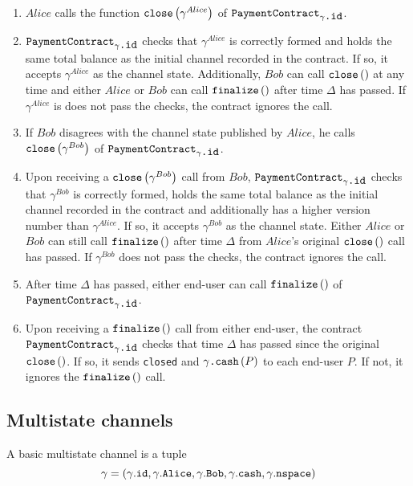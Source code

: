     \begin{enumerate}
      \item $Alice$ calls the function $\mbox{\texttt{close}}\left(\gamma^{Alice}\right)$
      of $\mbox{\texttt{PaymentContract}}_{\gamma\mbox{\texttt{.id}}}$.
      \item $\mbox{\texttt{PaymentContract}}_{\gamma\mbox{\texttt{.id}}}$ checks that
      $\gamma^{Alice}$ is correctly formed and holds the same total balance
      as the initial channel recorded in the contract. If so, it accepts $\gamma^{Alice}$
      as the channel state. Additionally, $Bob$ can call
      $\mbox{\texttt{close}}\left(\right)$ at any time and either $Alice$ or $Bob$ can
      call $\mbox{\texttt{finalize}}\left(\right)$ after time $\Delta$ has passed. If
      $\gamma^{Alice}$ is does not pass the checks, the contract ignores the call.
      \item If $Bob$ disagrees with the channel state published by $Alice$, he calls
      $\mbox{\texttt{close}}\left(\gamma^{Bob}\right)$ of
      $\mbox{\texttt{PaymentContract}}_{\gamma\mbox{\texttt{.id}}}$.
      \item Upon receiving a $\mbox{\texttt{close}}\left(\gamma^{Bob}\right)$ call from
      $Bob$, $\mbox{\texttt{PaymentContract}}_{\gamma\mbox{\texttt{.id}}}$ checks that
      $\gamma^{Bob}$ is correctly formed, holds the same total balance as the initial
      channel recorded in the contract and additionally has a higher version number than
      $\gamma^{Alice}$. If so, it accepts $\gamma^{Bob}$ as the channel state. Either
      $Alice$ or $Bob$ can still call $\mbox{\texttt{finalize}}\left(\right)$ after time
      $\Delta$ from $Alice$'s original $\mbox{\texttt{close}}\left(\right)$ call has
      passed. If $\gamma^{Bob}$ does not pass the checks, the contract ignores the call.
      \item After time $\Delta$ has passed, either end-user can call
      $\mbox{\texttt{finalize}}\left(\right)$ of
      $\mbox{\texttt{PaymentContract}}_{\gamma\mbox{\texttt{.id}}}$.
      \item Upon receiving a $\mbox{\texttt{finalize}}\left(\right)$ call from either
      end-user, the contract $\mbox{\texttt{PaymentContract}}_{\gamma\mbox{\texttt{.id}}}$
      checks that time $\Delta$ has passed since the original
      $\mbox{\texttt{close}}\left(\right)$. If so, it sends \texttt{closed} and
      $\gamma\mbox{\texttt{.cash}}\left(P\right)$ to each end-user $P$. If not, it ignores
      the $\mbox{\texttt{finalize}}\left(\right)$ call.
    \end{enumerate}

  \subsection{Multistate channels}
    A basic multistate channel is a tuple
    \begin{equation*}
      \gamma = \left(\gamma\mbox{.\texttt{id}}, \gamma\mbox{.\texttt{Alice}},
      \gamma\mbox{.\texttt{Bob}}, \gamma\mbox{.\texttt{cash}},
      \gamma\mbox{.\texttt{nspace}}\right)
    \end{equation*}

